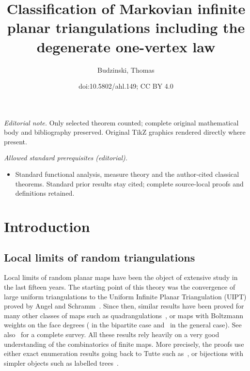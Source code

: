 \documentclass[10pt]{amsart}
\title{Classification of Markovian infinite planar triangulations including the degenerate one-vertex law}
\author{Budzinski, Thomas}
\date{doi:10.5802/ahl.149; CC BY 4.0}
\theoremstyle{definition}\newtheorem{defi}[theo]{Definition}\newtheorem{rema}[theo]{Remark}\newtheorem{exam}[theo]{Example}\newtheorem{exem}[theo]{Example}\newtheorem{nota}[theo]{Notation}
\begin{document}
\maketitle
\noindent\textit{Editorial note.} Only selected theorem counted; complete original mathematical body and bibliography preserved. Original TikZ graphics rendered directly where present.\par\medskip
\noindent\textit{Allowed standard prerequisites (editorial).}\begin{itemize}
\item Standard functional analysis, measure theory and the author-cited classical theorems. Standard prior results stay cited; complete source-local proofs and definitions retained.
\end{itemize}\medskip

\section{Introduction}

\subsection*{Local limits of random triangulations}
Local limits of random planar maps have been the object of extensive study in the last fifteen years. The starting point of this theory was the convergence of large uniform triangulations to the Uniform Infinite Planar Triangulation (UIPT) proved by Angel and Schramm~\cite{AS03}. Since then, similar results have been proved for many other classes of maps such as quadrangulations~\cite{CD06}, or maps with Boltzmann weights on the face degrees (\cite{BS13} in the bipartite case and~\cite{St18} in the general case). See also~\cite{C-StFlour} for a complete survey. All these results rely heavily on a very good understanding of the combinatorics of finite maps. More precisely, the proofs use either exact enumeration results going back to Tutte such as~\cite{Tut62}, or bijections with simpler objects such as labelled trees~\cite{CV81}.
\end{document}
